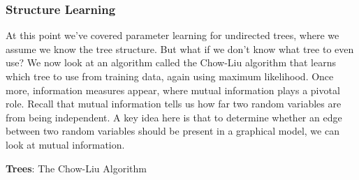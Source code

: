 \subsubsection{Structure Learning}

At this point we've covered parameter learning for undirected trees, where we assume we know the tree structure. But what if we don't know what tree to even use? We now look at an algorithm called the Chow-Liu algorithm that learns which tree to use from training data, again using maximum likelihood. Once more, information measures appear, where mutual information plays a pivotal role. Recall that mutual information tells us how far two random variables are from being independent. A key idea here is that to determine whether an edge between two random variables should be present in a graphical model, we can look at mutual information.

\textbf{Trees}: The Chow-Liu Algorithm
